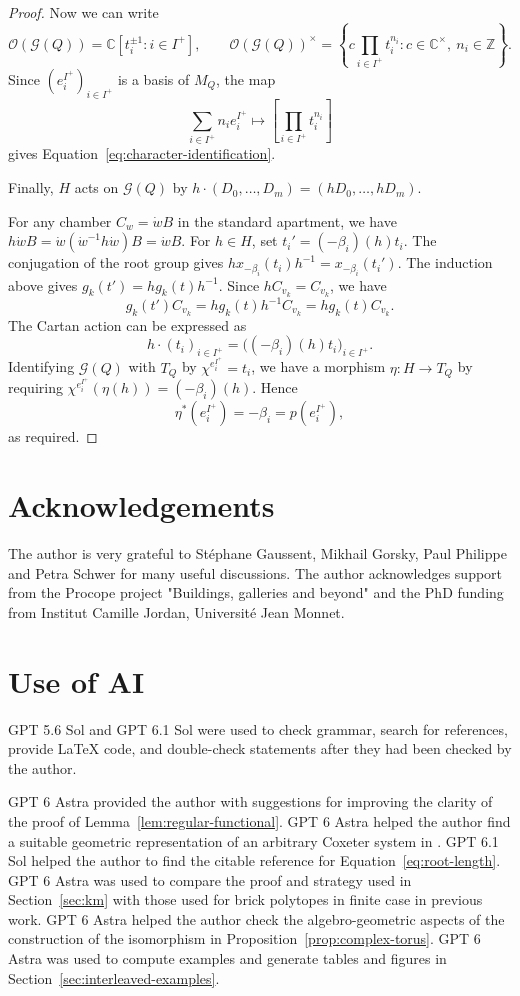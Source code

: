 \documentclass[11pt,a4paper]{article}
\theoremstyle{definition}
\theoremstyle{remark}
\numberwithin{equation}{section}
\newcommand{\Z}{\mathbb Z}
\newcommand{\C}{\mathbb C}
\begin{document}
\begin{proof}
Now we can write
\[
 \mathcal O(\mathcal G(Q))
 =\C[t_i^{\pm1}:i\in I^+],
 \qquad
 \mathcal O(\mathcal G(Q))^\times
 =\left\{c\prod_{i\in I^+}t_i^{n_i}:
 c\in\C^\times,\ n_i\in\Z\right\}.
\]
Since $(e_i^{I^+})_{i\in I^+}$ is a basis of $M_Q$, the map
\[
 \sum_{i\in I^+}n_i e_i^{I^+}
 \longmapsto
 \left[\prod_{i\in I^+}t_i^{n_i}\right]
\]
gives Equation~\eqref{eq:character-identification}.

Finally, $H$ acts on $\mathcal G(Q)$ by $h\cdot(D_0,\ldots,D_m)=(hD_0,\ldots,hD_m)$.

For any chamber $C_w=\dot wB$ in the standard apartment, we have $ h\dot wB=\dot w(\dot w^{-1}h\dot w)B=\dot wB$. For $h\in H$, set $t_i'=(-\beta_i)(h)t_i$. The conjugation of the root group gives $h x_{-\beta_i}(t_i)h^{-1}
 =x_{-\beta_i}(t_i')$. The induction above gives $g_k(t')=h g_k(t)h^{-1}$. Since $hC_{v_k}=C_{v_k}$, we have
\[
 g_k(t')C_{v_k}=h g_k(t)h^{-1}C_{v_k}=hg_k(t)C_{v_k}.
\]
The Cartan action can be expressed as
\[
 h\cdot(t_i)_{i\in I^+}
 =\bigl((-\beta_i)(h)t_i\bigr)_{i\in I^+}.
\]
Identifying $\mathcal G(Q)$ with $T_Q$ by $\chi^{e_i^{I^+}}=t_i$, we have a morphism $\eta:H\longrightarrow T_Q$ by requiring $\chi^{e_i^{I^+}}(\eta(h))=(-\beta_i)(h)$.
Hence
\[
 \eta^*(e_i^{I^+})=-\beta_i=p(e_i^{I^+}),
\]
as required.
\end{proof}





\section*{Acknowledgements}

The author is very grateful to Stéphane Gaussent, Mikhail Gorsky, Paul Philippe and Petra Schwer for many useful discussions. The author acknowledges support from the Procope project "Buildings, galleries and beyond" and the PhD funding from Institut Camille Jordan, Université Jean Monnet.

\section*{Use of AI}
GPT 5.6 Sol and GPT 6.1 Sol were used to check grammar, search for references, provide \LaTeX{} code, and double-check statements after they had been checked by the author.

GPT 6 Astra provided the author with suggestions for improving the clarity of the proof of Lemma~\ref{lem:regular-functional}. GPT 6 Astra helped the author find a suitable geometric representation of an arbitrary Coxeter system in \cite{RicheLectures}. GPT 6.1 Sol helped the author to find the citable reference \cite{FU} for Equation~\eqref{eq:root-length}. GPT 6 Astra was used to compare the proof and strategy used in Section~\ref{sec:km} with those used for brick polytopes in finite case in previous work. GPT 6 Astra helped the author check the algebro-geometric aspects of the construction of the isomorphism in Proposition~\ref{prop:complex-torus}. GPT 6 Astra was used to compute examples and generate tables and figures in Section~\ref{sec:interleaved-examples}.
\end{document}
